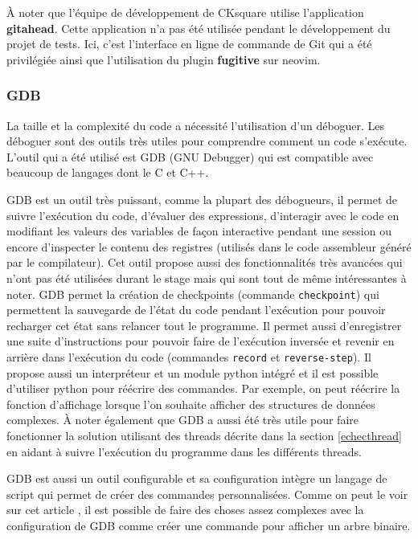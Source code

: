 \documentclass[a4paper]{article}
\begin{document}
À noter que l'équipe de développement de CKsquare utilise l'application
\textbf{gitahead}. Cette application n'a pas été utilisée pendant le
développement du projet de tests. Ici, c'est l'interface en ligne de commande de Git
qui a été privilégiée ainsi que l'utilisation du plugin \textbf{fugitive} sur
neovim.
\subsubsection{GDB}%

La taille et la complexité du code a nécessité l'utilisation d'un déboguer. Les
déboguer sont des outils très utiles pour comprendre comment un code
s'exécute. L'outil qui a été utilisé est GDB (GNU Debugger) qui est compatible
avec beaucoup de langages dont le C et C++.

GDB est un outil très puissant, comme la plupart des débogueurs, il permet de
suivre l'exécution du code, d'évaluer des expressions, d'interagir avec le code
en modifiant les valeurs des variables de façon interactive pendant une session
ou encore d'inspecter le contenu des registres (utilisés dans le code assembleur
généré par le compilateur). Cet outil propose aussi des fonctionnalités très
avancées qui n'ont pas été utilisées durant le stage mais qui sont tout de même
intéressantes à noter. GDB permet la création de checkpoints (commande
\verb|checkpoint|) qui permettent la sauvegarde de l'état du code pendant
l'exécution pour pouvoir recharger cet état sans relancer tout le programme. Il
permet aussi d'enregistrer une suite d'instructions pour pouvoir faire de
l'exécution inversée et revenir en arrière dans l'exécution du code (commandes
\verb|record| et \verb|reverse-step|). Il propose aussi un interpréteur et un
module python intégré et il est possible d'utiliser python pour réécrire des
commandes. Par exemple, on peut réécrire la fonction d'affichage lorsque l'on
souhaite afficher des structures de données complexes. À noter également que GDB
a aussi été très utile pour faire fonctionner la solution utilisant des threads
décrite dans la section \ref{echecthread} en aidant à suivre l'exécution du
programme dans les différents threads.

GDB est aussi un outil configurable et sa configuration intègre un langage de
script qui permet de créer des commandes personnalisées. Comme on peut le voir
sur cet article \cite{gdbinit}, il est possible de faire des choses assez
complexes avec la configuration de GDB comme créer une commande pour afficher un
arbre binaire.
\end{document}
